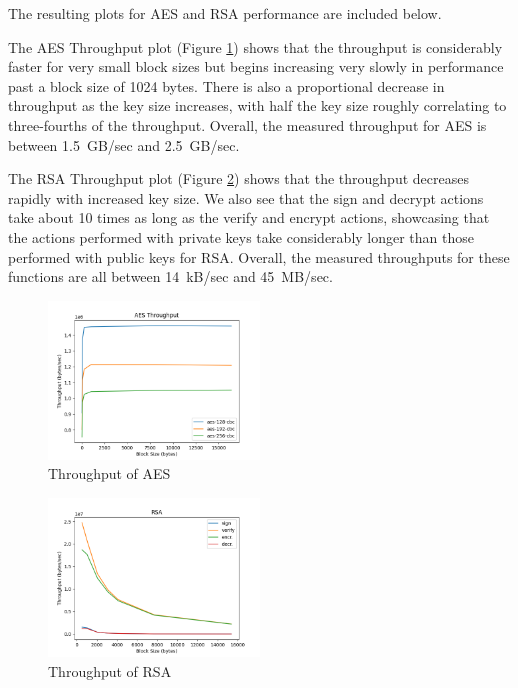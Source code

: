 \documentclass[11pt]{article}
\begin{document}
The resulting plots for AES and RSA performance are included below.

The AES Throughput plot (Figure \ref{fig:aes}) shows that the throughput is considerably faster for very small block sizes but begins increasing very slowly in performance past a block size of 1024 bytes. There is also a proportional decrease in throughput as the key size increases, with half the key size roughly correlating to three-fourths of the throughput. Overall, the measured throughput for AES is between 1.5~GB/sec and 2.5~GB/sec.

The RSA Throughput plot (Figure \ref{fig:rsa}) shows that the throughput decreases rapidly with increased key size. We also see that the sign and decrypt actions take about 10 times as long as the verify and encrypt actions, showcasing that the actions performed with private keys take considerably longer than those performed with public keys for RSA. Overall, the measured throughputs for these functions are all between 14~kB/sec and 45~MB/sec.

\begin{figure}[!ht]
	\centering
	\includegraphics[width=0.5\textwidth]{./assets/aes.png}
	\caption{Throughput of AES}
	\label{fig:aes}
\end{figure}

\begin{figure}[!ht]
	\centering
	\includegraphics[width=0.5\textwidth]{./assets/rsa.png}
	\caption{Throughput of RSA}
	\label{fig:rsa}
\end{figure}
\end{document}
